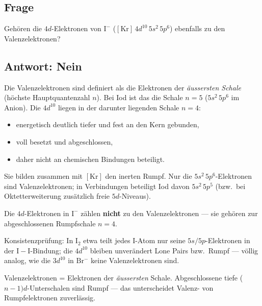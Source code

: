 
\subsection*{Frage}
Gehören die $4d$-Elektronen von $\mathrm{I^-}$
($[\mathrm{Kr}]\,4d^{10}\,5s^2\,5p^6$) ebenfalls zu den Valenzelektronen?

\subsection*{Antwort: Nein}
Die Valenzelektronen sind definiert als die Elektronen der \textit{äussersten
Schale} (höchste Hauptquantenzahl $n$). Bei Iod ist das die Schale $n=5$
($5s^2\,5p^6$ im Anion). Die $4d^{10}$ liegen in der darunter liegenden Schale
$n=4$:

\begin{itemize}
  \item energetisch deutlich tiefer und fest an den Kern gebunden,
  \item voll besetzt und abgeschlossen,
  \item daher nicht an chemischen Bindungen beteiligt.
\end{itemize}
Sie bilden zusammen mit $[\mathrm{Kr}]$ den inerten Rumpf. Nur die
$5s^2\,5p^6$-Elektronen sind Valenzelektronen; in Verbindungen beteiligt Iod
davon $5s^2\,5p^5$ (bzw.\ bei Oktetterweiterung zusätzlich freie $5d$-Niveaus).

\begin{ergebnis}
Die $4d$-Elektronen in $\mathrm{I^-}$ zählen \textbf{nicht} zu den
Valenzelektronen --- sie gehören zur abgeschlossenen Rumpfschale $n=4$.
\end{ergebnis}

\begin{kontrolle}
Konsistenzprüfung: In $\mathrm{I_2}$ etwa teilt jedes I-Atom nur seine
$5s/5p$-Elektronen in der $\mathrm{I-I}$-Bindung; die $4d^{10}$ bleiben unverändert
Lone Pairs bzw.\ Rumpf --- völlig analog, wie die $3d^{10}$ in $\mathrm{Br^-}$
keine Valenzelektronen sind.
\end{kontrolle}

\begin{merksatz}
Valenzelektronen = Elektronen der \textit{äussersten} Schale. Abgeschlossene
tiefe ($n-1)d$-Unterschalen sind Rumpf --- das unterscheidet Valenz- von
Rumpfelektronen zuverlässig.
\end{merksatz}

